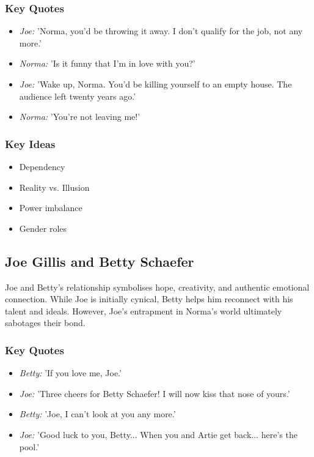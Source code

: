 \documentclass[a4paper]{article}
\begin{document}
\subsubsection*{Key Quotes}
\begin{itemize}
    \item \textit{Joe:} 'Norma, you'd be throwing it away. I don't qualify for the job, not any more.'
    \item \textit{Norma:} 'Is it funny that I'm in love with you?'
    \item \textit{Joe:} 'Wake up, Norma. You’d be killing yourself to an empty house. The audience left twenty years ago.'
    \item \textit{Norma:} 'You're not leaving me!'
\end{itemize}

\subsubsection*{Key Ideas}
\begin{itemize}
    \item Dependency
    \item Reality vs. Illusion
    \item Power imbalance
    \item Gender roles
\end{itemize}

\subsection{Joe Gillis and Betty Schaefer}
Joe and Betty’s relationship symbolises hope, creativity, and authentic emotional connection. While Joe is initially cynical, Betty helps him reconnect with his talent and ideals. However, Joe’s entrapment in Norma’s world ultimately sabotages their bond.

\subsubsection*{Key Quotes}
\begin{itemize}
    \item \textit{Betty:} 'If you love me, Joe.'
    \item \textit{Joe:} 'Three cheers for Betty Schaefer! I will now kiss that nose of yours.'
    \item \textit{Betty:} 'Joe, I can't look at you any more.'
    \item \textit{Joe:} 'Good luck to you, Betty... When you and Artie get back... here’s the pool.'
\end{itemize}
\end{document}
